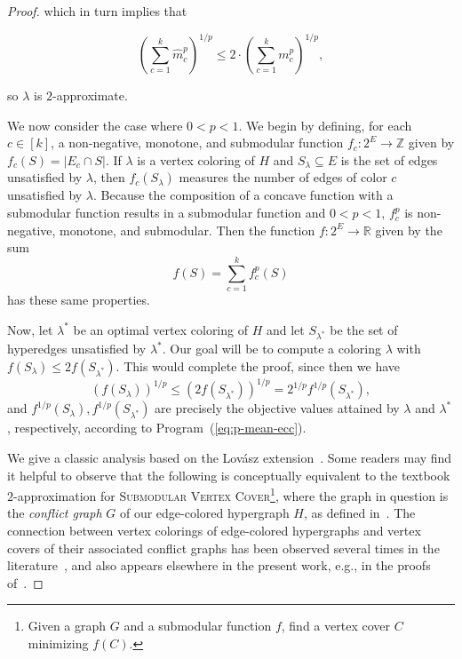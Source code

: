 \begin{proof}
    which in turn implies that

    \[
        \left(\sum_{c=1}^k \hat{m}_c^p\right)^{1/p} \leq 2 \cdot \left(\sum_{c=1}^k m_c^p\right)^{1/p},
    \]

    so $\lambda$ is $2$-approximate.

    We now consider the case where $0 < p < 1$.
    We begin by defining, for each $c \in [k]$, a non-negative, monotone, and submodular function $f_c\colon 2^E \rightarrow \mathbb{Z}$ given by $f_c(S) = |E_c \cap S|$.
    If $\lambda$ is a vertex coloring of $H$ and $S_\lambda \subseteq E$ is the set of edges unsatisfied by $\lambda$, then $f_c(S_\lambda)$ measures the number of edges of color $c$ unsatisfied by $\lambda$.
    Because the composition of a concave function with a submodular function results in a submodular function and $0 < p < 1$, $f_c^p$ is non-negative, monotone, and submodular.
    Then the function $f\colon 2^E \rightarrow \mathbb{R}$ given by the sum
    \[
        f(S) = \sum_{c=1}^{k} f_c^p(S)
    \]
    has these same properties.

    Now, let $\lambda^*$ be an optimal vertex coloring of $H$ and let $S_{\lambda^*}$ be the set of hyperedges unsatisfied by $\lambda^*$.
    Our goal will be to compute a coloring $\lambda$ with $f(S_\lambda) \leq 2f(S_{\lambda^*})$.
    This would complete the proof, since then we have
    \[
        (f(S_\lambda))^{1/p} \leq (2f(S_{\lambda^*}))^{1/p} = 2^{1/p}f^{1/p}(S_{\lambda^*}),
    \]
    and $f^{1/p}(S_{\lambda}), f^{1/p}(S_{\lambda^*})$ are precisely the objective values attained by $\lambda$ and $\lambda^*$, respectively, according to Program~(\ref{eq:p-mean-ecc}).

    We give a classic analysis based on the Lov{\'a}sz extension~\cite{lovasz1983submodular}.
    Some readers may find it helpful to observe that the following is conceptually equivalent to the textbook $2$-approximation for \textsc{Submodular Vertex Cover}\footnote{Given a graph $G$ and a submodular function $f$, find a vertex cover $C$ minimizing $f(C)$.}, where the graph in question is the \emph{conflict graph} $G$ of our edge-colored hypergraph $H$, as defined in~.
    The connection between vertex colorings of edge-colored hypergraphs and vertex covers of their associated conflict graphs has been observed several times in the literature~\cite{angel2016clustering,cai2018alternating,kellerhals2023parameterized,veldt2023optimal}, and also appears elsewhere in the present work, e.g., in the proofs of~.


\end{proof}
